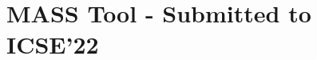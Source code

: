 \documentclass[acmsmall,nonacm]{acmart}
\begin{document}
\section{MASS Tool - Submitted to ICSE'22}

%





\end{document}
